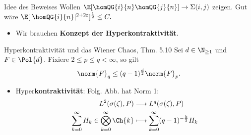 \begin{frame}{Idee des Beweises}
    Wollen \textcolor{orange}{$\E[\homQG{i}{n}\homQG{j}{n}] \to \Sigma(i,j)$} zeigen.
    Gut wäre $\E[|\homQG{i}{n}|^{2 + 2\varepsilon}]^{\frac{1}{2}} \leq C.$ 
    \pause
    \begin{itemize}
        \item Wir brauchen \textbf{Konzept der Hyperkontraktivität}. 
    \end{itemize}
    \begin{satzblockname}{Hyperkontraktivität und das Wiener Chaos, \cite{ghs} Thm. 5.10}
        Sei $d \in \N_{\geq 1}$ und $F \in \Pol{d}$. Fixiere $2 \leq p \leq q < \infty$, so gilt \[
        \norm{F}_q \leq (q-1)^{\frac{d}{2}}\norm{F}_p.
        \]
    \end{satzblockname}
\begin{itemize}
    \pause
    \small
    \item Hyper\textbf{kontraktivität}: Folg. Abb. hat Norm 1:
    \begin{align*}L^2(\sigma(\zeta), P) &\longrightarrow L^q(\sigma(\zeta), P) \\ \sum_{k = 0}^\infty H_k\in \bigotimes_{k=0}^\infty \Ch{k} &\longmapsto \sum_{k = 0}^\infty (q-1)^{-\frac{k}{2}}H_k \end{align*}  
    \end{itemize}
\end{frame}

